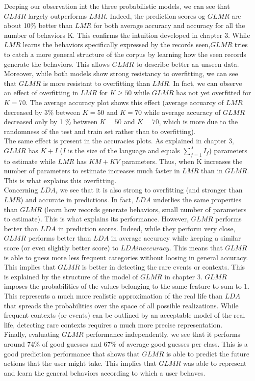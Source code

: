 Deeping our observation int the three probabilistic models, we can see that $GLMR$ largely outperforms $LMR$. Indeed, the prediction scores og $GLMR$ are about 10\% better than $LMR$ for both average accuracy and accuracy for all the number of behaviors K. This confirms the intuition developed in chapter 3. While $LMR$ learns the behaviors specifically expressed by the records seen,$GLMR$ tries to catch a more general structure of the corpus by learning how the seen records generate the behaviors. This allows $GLMR$ to describe better an unseen data. Moreover, while both models show strong resistancy to overfitting, we can see that $GLMR$ is more resistant to overfitting than $LMR$. In fact, we can observe an effect of overfitting in $LMR$ for $K\geqslant 50$ while $GLMR$ has not yet overfitted for $K=70$. The average accuracy plot shows this effect (average accuarcy of $LMR$ decreased by 3\% between $K = 50$ and $K = 70$ while average accuracy of $GLMR$ decreased only by 1 \% between $K = 50$ and $K = 70$, which is more due to the randomness of the test and train set rather than to overfitting). 
\\ The same effect is present in the accuracies plots. As explained in chapter 3, $GLMR$ has $K+I$ ($I$ is the size of the language and equals $\sum_{f=1}^{J} I_f$) parameters to estimate while $LMR$ has $KM + KV$ parameters. Thus, when K increases the number of parameters to estimate increases much faster in $LMR$ than in $GLMR$. This is what explains this overfitting.
\\Concerning $LDA$, we see that it is also strong to overfitting (and stronger than $LMR$) and accurate in predictions. In fact, $LDA$ underlies the same properties than $GLMR$ (learn how records generate behaviors, small number of parameters to estimate). This is what explains its performance. However, $GLMR$ performs better than $LDA$ in prediction scores. Indeed, while they perform very close, $GLMR$ performs better than $LDA$ in average accuracy while keeping a similar score (or even slightly better score) to $LDA in accuracy$. This means that $GLMR$ is able to guess more less frequent categories without loosing in general accuracy. This implies that $GLMR$ is better in detecting the rare events or contexts. This is explained by the structure of the model of $GLMR$ in chapter 3. $GLMR$ imposes the probabilities of the values belonging to the same feature to sum to 1. This represents a much more realistic approximation of the real life than $LDA$ that spreads the probabilities over the space of all possible realizations. While frequent contexts (or events) can be outlined by an acceptable model of the real life, detecting rare contexts requires a much more precise representation.
\\Finally, evaluating $GLMR$ performance independently, we see that it performs around 74\% of good guesses and 67\% of average good guesses per class. This is a good prediction performance that shows that $GLMR$ is able to predict the future actions that the user might take. This implies that $GLMR$ was able to represent and learn the general behaviors according to which a user behaves.


